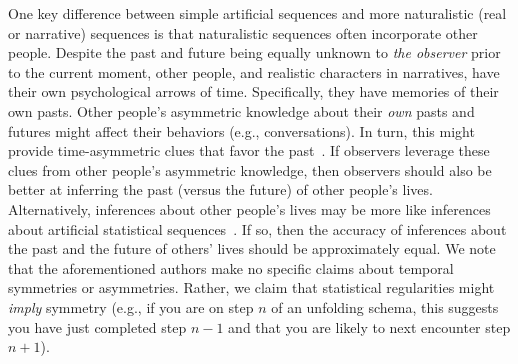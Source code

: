 \documentclass[10pt]{article}
\begin{document}
One key difference between simple artificial sequences and more naturalistic (real or narrative) sequences is that naturalistic sequences often incorporate other people. Despite the past and future being equally unknown to \textit{the observer} prior to the current moment, other people, and realistic characters in narratives, have their own psychological arrows of time. Specifically, they have memories of their own pasts. Other people's asymmetric knowledge about their \textit{own} pasts and futures might affect their behaviors (e.g., conversations). In turn, this might provide time-asymmetric clues that favor the past~\citep[e.g., other people might talk more about their own pasts than their futures; ][]{DemiEtal18}. If observers leverage these clues from other people's asymmetric knowledge, then observers should also be better at inferring the past (versus the future) of other people's lives. Alternatively, inferences about other people's lives may be more like inferences about artificial statistical sequences~\citep[e.g., perhaps solely relying on statistical regularities like event schemas, scripts, or situation models;][]{RadvCope06, ZwaaRadv98, BoweEtal79, RangRitc12, BaldEtal18}. If so, then the accuracy of inferences about the past and the future of others' lives should be approximately equal. We note that the aforementioned authors make no specific claims about temporal symmetries or asymmetries. Rather, we claim that statistical regularities might \textit{imply} symmetry (e.g., if you are on step $n$ of an unfolding schema, this suggests you have just completed step $n - 1$ and that you are likely to next encounter step $n + 1$).
\end{document}
